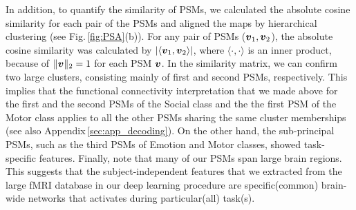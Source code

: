 %
In addition, to quantify the similarity of PSMs, we calculated the
absolute cosine similarity for each pair of the PSMs and aligned the
maps by hierarchical clustering (see Fig.\,\ref{fig:PSA}(b)).
%
For any pair of PSMs ($\mbox{\boldmath $v$}_1, \mbox{\boldmath $v$}_2$), the absolute cosine similarity was calculated by $\left|\langle\mbox{\boldmath $v$}_1, \mbox{\boldmath $v$}_2\rangle\right|$, where $\langle\cdot, \cdot\rangle$ is an inner product, because of $\|\mbox{\boldmath $v$}\|_2 = 1$ for each PSM $\mbox{\boldmath $v$}$.
%
In the similarity matrix, we can confirm two large clusters, consisting mainly of first and second PSMs, respectively.
%
This implies that the functional connectivity interpretation that we
made above for the first and the second PSMs of the Social class and the
the first PSM of the Motor class applies to all the other PSMs sharing
the same cluster memberships (see also Appendix\,\ref{sec:app_decoding}).
%
On the other hand, the sub-principal PSMs, such as the third PSMs of Emotion and Motor classes, showed task-specific features.
%
Finally, note that many of our PSMs span large brain regions.
%
This suggests that the subject-independent features that we extracted from the large fMRI database in our deep learning procedure are specific(common) brain-wide networks that activates during particular(all) task(s).
%
